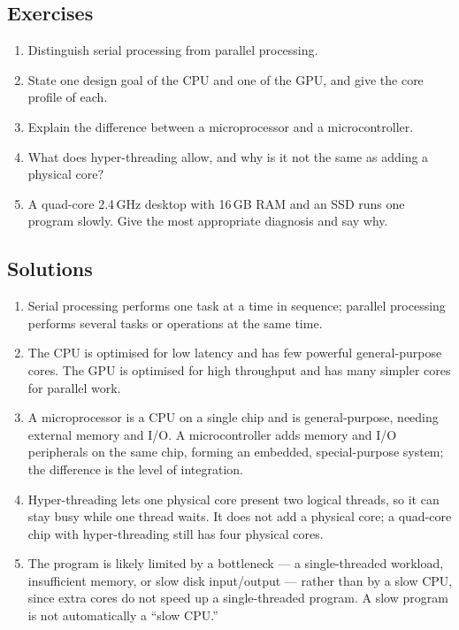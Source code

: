 \documentclass[11pt]{article}
\begin{document}
\subsection*{Exercises}
\begin{enumerate}[label=\arabic*.]
  \item Distinguish serial processing from parallel processing.
  \item State one design goal of the CPU and one of the GPU, and give the
    core profile of each.
  \item Explain the difference between a microprocessor and a microcontroller.
  \item What does hyper-threading allow, and why is it not the same as adding
    a physical core?
  \item A quad-core 2.4\,GHz desktop with 16\,GB RAM and an SSD runs one
    program slowly. Give the most appropriate diagnosis and say why.
\end{enumerate}

\subsection*{Solutions}
\begingroup\small
\begin{enumerate}[label=\arabic*.]
  \item Serial processing performs one task at a time in sequence; parallel
    processing performs several tasks or operations at the same time.
  \item The CPU is optimised for low latency and has few powerful
    general-purpose cores. The GPU is optimised for high throughput and has
    many simpler cores for parallel work.
  \item A microprocessor is a CPU on a single chip and is general-purpose,
    needing external memory and I/O. A microcontroller adds memory and I/O
    peripherals on the same chip, forming an embedded, special-purpose system;
    the difference is the level of integration.
  \item Hyper-threading lets one physical core present two logical threads, so
    it can stay busy while one thread waits. It does not add a physical core;
    a quad-core chip with hyper-threading still has four physical cores.
  \item The program is likely limited by a bottleneck --- a single-threaded
    workload, insufficient memory, or slow disk input/output --- rather than
    by a slow CPU, since extra cores do not speed up a single-threaded
    program. A slow program is not automatically a ``slow CPU.''
\end{enumerate}
\endgroup
\end{document}
